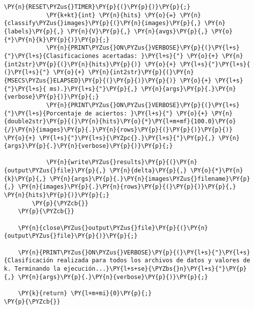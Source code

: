 \begin{Verbatim}[commandchars=\\\{\}]
			\PY{n}{RESET\PYZus{}TIMER}\PY{p}{(}\PY{p}{)}\PY{p}{;}
			\PY{k+kt}{int} \PY{n}{hits} \PY{o}{=} \PY{n}{classify\PYZus{}images}\PY{p}{(}\PY{n}{images}\PY{p}{,} \PY{n}{labels}\PY{p}{,} \PY{n}{V}\PY{p}{,} \PY{n}{avgs}\PY{p}{,} \PY{o}{*}\PY{n}{k}\PY{p}{)}\PY{p}{;}
			\PY{n}{PRINT\PYZus{}ON\PYZus{}VERBOSE}\PY{p}{(}\PY{l+s}{"}\PY{l+s}{Clasificaciones acertadas: }\PY{l+s}{"} \PY{o}{+} \PY{n}{int2str}\PY{p}{(}\PY{n}{hits}\PY{p}{)} \PY{o}{+} \PY{l+s}{"}\PY{l+s}{ (}\PY{l+s}{"} \PY{o}{+} \PY{n}{int2str}\PY{p}{(}\PY{n}{MSECS\PYZus{}ELAPSED}\PY{p}{(}\PY{p}{)}\PY{p}{)} \PY{o}{+} \PY{l+s}{"}\PY{l+s}{ ms).}\PY{l+s}{"}\PY{p}{,} \PY{n}{args}\PY{p}{.}\PY{n}{verbose}\PY{p}{)}\PY{p}{;}
			\PY{n}{PRINT\PYZus{}ON\PYZus{}VERBOSE}\PY{p}{(}\PY{l+s}{"}\PY{l+s}{Porcentaje de aciertos: }\PY{l+s}{"} \PY{o}{+} \PY{n}{double2str}\PY{p}{(}\PY{n}{hits}\PY{o}{*}\PY{l+m+mf}{100.0}\PY{o}{/}\PY{n}{images}\PY{p}{.}\PY{n}{rows}\PY{p}{(}\PY{p}{)}\PY{p}{)} \PY{o}{+} \PY{l+s}{"}\PY{l+s}{\PYZpc{}.}\PY{l+s}{"}\PY{p}{,} \PY{n}{args}\PY{p}{.}\PY{n}{verbose}\PY{p}{)}\PY{p}{;}

			\PY{n}{write\PYZus{}results}\PY{p}{(}\PY{n}{output\PYZus{}file}\PY{p}{,} \PY{n}{delta}\PY{p}{,} \PY{o}{*}\PY{n}{k}\PY{p}{,} \PY{n}{args}\PY{p}{.}\PY{n}{images\PYZus{}filename}\PY{p}{,} \PY{n}{images}\PY{p}{.}\PY{n}{rows}\PY{p}{(}\PY{p}{)}\PY{p}{,} \PY{n}{hits}\PY{p}{)}\PY{p}{;}
		\PY{p}{\PYZcb{}}
	\PY{p}{\PYZcb{}}

	\PY{n}{close\PYZus{}output\PYZus{}file}\PY{p}{(}\PY{n}{output\PYZus{}file}\PY{p}{)}\PY{p}{;}

	\PY{n}{PRINT\PYZus{}ON\PYZus{}VERBOSE}\PY{p}{(}\PY{l+s}{"}\PY{l+s}{Clasificación realizada para todos los archivos de datos y valores de k. Terminando la ejecución...}\PY{l+s+se}{\PYZbs{}n}\PY{l+s}{"}\PY{p}{,} \PY{n}{args}\PY{p}{.}\PY{n}{verbose}\PY{p}{)}\PY{p}{;}

	\PY{k}{return} \PY{l+m+mi}{0}\PY{p}{;}
\PY{p}{\PYZcb{}}
\end{Verbatim}
